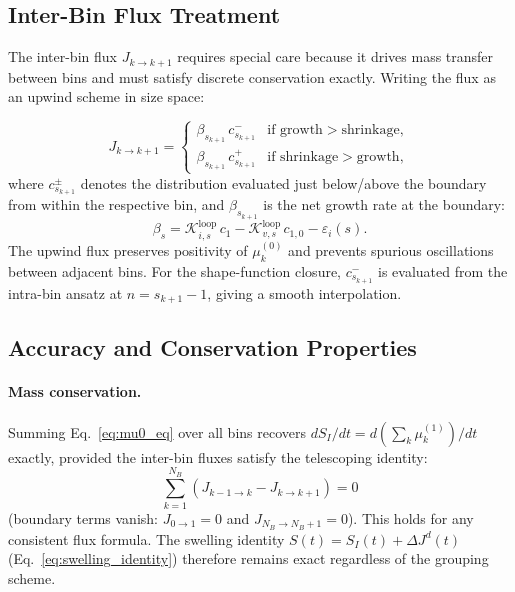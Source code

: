 \documentclass[pdflatex,sn-basic]{sn-jnl} %
\begin{document}
\subsection{Inter-Bin Flux Treatment}
\label{sec:interbin_flux}

The inter-bin flux $J_{k \to k+1}$ requires special care because it
drives mass transfer between bins and must satisfy discrete conservation
exactly. Writing the flux as an upwind scheme in size space:

\begin{equation}\label{eq:flux_upwind}
    J_{k \to k+1} =
    \begin{cases}
        \beta_{s_{k+1}}\,c_{s_{k+1}}^- & \text{if growth} > \text{shrinkage},\\
        \beta_{s_{k+1}}\,c_{s_{k+1}}^+ & \text{if shrinkage} > \text{growth},
    \end{cases}
\end{equation}
where $c_{s_{k+1}}^{\pm}$ denotes the distribution evaluated just
below/above the boundary from within the respective bin, and
$\beta_{s_{k+1}}$ is the net growth rate at the boundary:
\begin{equation}\label{eq:beta}
    \beta_s = \mathcal{K}_{i,s}^{\mathrm{loop}}\,c_1
            - \mathcal{K}_{v,s}^{\mathrm{loop}}\,c_{1,0}
            - \varepsilon_i(s).
\end{equation}
The upwind flux preserves positivity of $\mu_k^{(0)}$ and prevents
spurious oscillations between adjacent bins. For the shape-function
closure, $c_{s_{k+1}}^-$ is evaluated from the intra-bin ansatz at
$n = s_{k+1} - 1$, giving a smooth interpolation.

\subsection{Accuracy and Conservation Properties}
\label{sec:moment_accuracy}

\paragraph{Mass conservation.}
Summing Eq.~\eqref{eq:mu0_eq} over all bins recovers
$dS_I/dt = d(\sum_k \mu_k^{(1)})/dt$ exactly, provided the inter-bin
fluxes satisfy the telescoping identity:
\begin{equation}\label{eq:flux_telescoping}
    \sum_{k=1}^{N_B}(J_{k-1\to k} - J_{k\to k+1}) = 0
\end{equation}
(boundary terms vanish: $J_{0\to 1} = 0$ and $J_{N_B\to N_B+1} = 0$).
This holds for any consistent flux formula. The swelling identity
$S(t) = S_I(t) + \Delta J^d(t)$ (Eq.~\ref{eq:swelling_identity})
therefore remains exact regardless of the grouping scheme.
\end{document}
